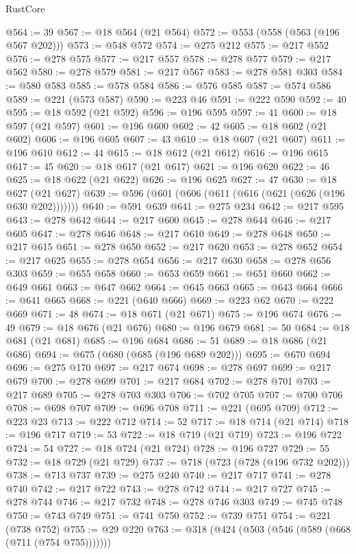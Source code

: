 \begin{lexlean}{RustCore}
\begin{coremodule}
@564 := 39
@567 := @18 @564 (@21 @564)
@572 := @553 (@558 (@563 (@196 @567 @202)))
@573 := @548 @572
@574 := @275 @212
@575 := @217 @552
@576 := @278 @575
@577 := @217 @557
@578 := @278 @577
@579 := @217 @562
@580 := @278 @579
@581 := @217 @567
@583 := @278 @581 @303
@584 := @580 @583
@585 := @578 @584
@586 := @576 @585
@587 := @574 @586
@589 := @221 (@573 @587)
@590 := @223 @46
@591 := @222 @590
@592 := 40
@595 := @18 @592 (@21 @592)
@596 := @196 @595
@597 := 41
@600 := @18 @597 (@21 @597)
@601 := @196 @600
@602 := 42
@605 := @18 @602 (@21 @602)
@606 := @196 @605
@607 := 43
@610 := @18 @607 (@21 @607)
@611 := @196 @610
@612 := 44
@615 := @18 @612 (@21 @612)
@616 := @196 @615
@617 := 45
@620 := @18 @617 (@21 @617)
@621 := @196 @620
@622 := 46
@625 := @18 @622 (@21 @622)
@626 := @196 @625
@627 := 47
@630 := @18 @627 (@21 @627)
@639 := @596 (@601 (@606 (@611 (@616 (@621 (@626 (@196 @630 @202)))))))
@640 := @591 @639
@641 := @275 @234
@642 := @217 @595
@643 := @278 @642
@644 := @217 @600
@645 := @278 @644
@646 := @217 @605
@647 := @278 @646
@648 := @217 @610
@649 := @278 @648
@650 := @217 @615
@651 := @278 @650
@652 := @217 @620
@653 := @278 @652
@654 := @217 @625
@655 := @278 @654
@656 := @217 @630
@658 := @278 @656 @303
@659 := @655 @658
@660 := @653 @659
@661 := @651 @660
@662 := @649 @661
@663 := @647 @662
@664 := @645 @663
@665 := @643 @664
@666 := @641 @665
@668 := @221 (@640 @666)
@669 := @223 @62
@670 := @222 @669
@671 := 48
@674 := @18 @671 (@21 @671)
@675 := @196 @674
@676 := 49
@679 := @18 @676 (@21 @676)
@680 := @196 @679
@681 := 50
@684 := @18 @681 (@21 @681)
@685 := @196 @684
@686 := 51
@689 := @18 @686 (@21 @686)
@694 := @675 (@680 (@685 (@196 @689 @202)))
@695 := @670 @694
@696 := @275 @170
@697 := @217 @674
@698 := @278 @697
@699 := @217 @679
@700 := @278 @699
@701 := @217 @684
@702 := @278 @701
@703 := @217 @689
@705 := @278 @703 @303
@706 := @702 @705
@707 := @700 @706
@708 := @698 @707
@709 := @696 @708
@711 := @221 (@695 @709)
@712 := @223 @23
@713 := @222 @712
@714 := 52
@717 := @18 @714 (@21 @714)
@718 := @196 @717
@719 := 53
@722 := @18 @719 (@21 @719)
@723 := @196 @722
@724 := 54
@727 := @18 @724 (@21 @724)
@728 := @196 @727
@729 := 55
@732 := @18 @729 (@21 @729)
@737 := @718 (@723 (@728 (@196 @732 @202)))
@738 := @713 @737
@739 := @275 @240
@740 := @217 @717
@741 := @278 @740
@742 := @217 @722
@743 := @278 @742
@744 := @217 @727
@745 := @278 @744
@746 := @217 @732
@748 := @278 @746 @303
@749 := @745 @748
@750 := @743 @749
@751 := @741 @750
@752 := @739 @751
@754 := @221 (@738 @752)
@755 := @29 @220
@763 := @318 (@424 (@503 (@546 (@589 (@668 (@711 (@754 @755)))))))

\end{coremodule}
\end{lexlean}
